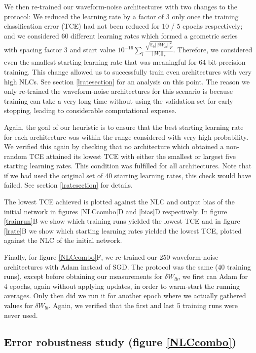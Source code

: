 \documentclass{article} %
\begin{document}
We then re-trained our waveform-noise architectures with two changes to the protocol: We reduced the learning rate by a factor of 3 only once the training classification error (TCE) had not been reduced for 10 / 5 epochs respectively; and we considered 60 different learning rates which formed a geometric series with spacing factor 3 and start value $10^{-16}\sum_l\frac{\sqrt{\mathbb{E}_{b}||\delta W_{lb}||_F^2}}{||W_l||_F}$. Therefore, we considered even the smallest starting learning rate that was meaningful for 64 bit precision training. This change allowed us to successfully train even architectures with very high NLCs. See section \ref{lratesection} for an analysis on this point. The reason we only re-trained the waveform-noise architectures for this scenario is because training can take a very long time without using the validation set for early stopping, leading to considerable computational expense.

Again, the goal of our heuristic is to ensure that the best starting learning rate for each architecture was within the range considered with very high probability. We verified this again by checking that no architecture which obtained a non-random TCE attained its lowest TCE with either the smallest or largest five starting learning rates. This condition was fulfilled for all architectures. Note that if we had used the original set of 40 starting learning rates, this check would have failed. See section \ref{lratesection} for details.

The lowest TCE achieved is plotted against the NLC and output bias of the initial network in figures \ref{NLCcombo}D and \ref{bias}D respectively. In figure \ref{trainrun}B we show which training runs yielded the lowest TCE and in figure \ref{lrate}B we show which starting learning rates yielded the lowest TCE, plotted against the NLC of the initial network.

Finally, for figure \ref{NLCcombo}F, we re-trained our 250 waveform-noise architectures with Adam instead of SGD. The protocol was the same (40 training runs), except before obtaining our measurements for $\delta W_{lb}$, we first ran Adam for 4 epochs, again without applying updates, in order to warm-start the running averages. Only then did we run it for another epoch where we actually gathered values for $\delta W_{lb}$. Again, we verified that the first and last 5 training runs were never used.

\subsection{Error robustness study (figure \ref{NLCcombo})} \label{errorRobustnessDetails}
\end{document}
